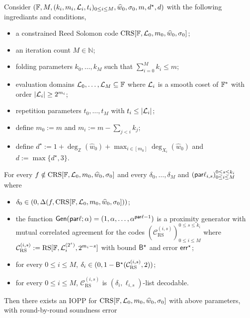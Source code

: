 \begin{theorem}\label{thm: whir_rbr_soundness}
    Consider $(\mathbb{F}, M, (k_i, m_i, \mathcal{L}_i, t_i)_{0 \leq i \leq M}, \widehat{w}_0, \sigma_0, m, d^\star, d)$ with the following ingrediants and conditions,
    \begin{itemize}
    \item a constrained Reed Solomon code $\mathrm{CRS}[\mathbb{F}, \mathcal{L}_0, m_0, \widehat{w}_0, \sigma_0]$;
    \item an iteration count $M \in \mathbb{N}$;
    \item folding parameters $k_0, \ldots, k_{M}$ such that $\sum_{i=0}^{M} k_i \leq m$;
    \item evaluation domains $\mathcal{L}_0, \ldots, \mathcal{L}_{M} \subseteq \mathbb{F}$ where $\mathcal{L}_i$ is a smooth coset of $\mathbb{F}^*$ with order $|\mathcal{L}_i| \geq 2^{m_i}$;
    \item repetition parameters $t_0, \ldots, t_M$ with $t_i \leq |\mathcal{L}_i|$;
    \item define $m_0 := m$ and $m_i := m - \sum_{j < i} k_j$;
    \item define $d^\star := 1 + \deg_{\mathbb{Z}}(\widehat{w}_0) + \max_{i \in [m_0]} \deg_{X_i}(\widehat{w}_0)$ and $d := \max\{d^\star, 3\}$.
    \end{itemize}
    For every $f \notin \mathrm{CRS}[\mathbb{F}, \mathcal{L}_0, m_0, \widehat{w}_0, \sigma_0]$ and every $\delta_0, \dots, \delta_{M}$ and $(\mathsf{par}\ell_{i,s})_{0 \leq i \leq M}^{0 \leq s \leq k_i}$ where
    \begin{itemize}
        \item $\delta_0 \in (0, \Delta(f, \mathrm{CRS}[\mathbb{F}, \mathcal{L}_0, m_0, \widehat{w}_0, \sigma_0]))$;
        \item the function $\mathsf{Gen}(\mathsf{par}\ell; \alpha) = (1, \alpha, \dots, \alpha^{\mathsf{par}\ell-1})$ is a proximity generator with mutual correlated agreement for the codes $(\mathcal{C}_{\mathrm{RS}}^{(i,s)})_{0 \leq i \leq M}^{0 \leq s \leq k_i}$ where $\mathcal{C}_{\mathrm{RS}}^{(i,s)} := \mathrm{RS}[\mathbb{F}, \mathcal{L}_i^{(2^s)}, 2^{m_i - s}]$ with bound ${\mathsf{B}}^\star$ and error $\mathsf{err}^\star$;
        \item for every $0 \leq i \le M$, $\delta_i \in (0, 1 - {\mathsf{B}}^\star(\mathcal{C}_{\mathrm{RS}}^{(i,s)}, 2))$;
        \item for every $0 \leq i \le M$, $\mathcal{C}_{\mathrm{RS}}^{(i,s)}$ is $(\delta_i, \ell_{i,s})$-list decodable.
    \end{itemize}
   Then there exists an IOPP for $\mathrm{CRS}[\mathbb{F}, \mathcal{L}_0, m_0, \widehat{w}_0, \sigma_0]$ with above parameters, with round-by-round soundness error


\end{theorem}
